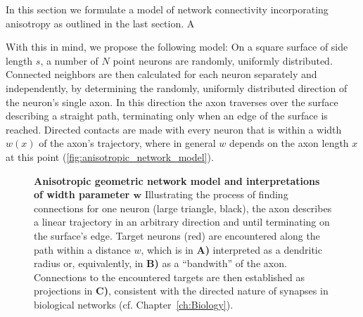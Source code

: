 




In this section we formulate a model of network connectivity
incorporating anisotropy as outlined in the last section. A 

With this in mind, we propose the following model: On a square surface
of side length $s$, a number of $N$ point neurons are randomly,
uniformly distributed.  Connected neighbors are then calculated for
each neuron separately and independently, by determining the randomly,
uniformly distributed direction of the neuron's single axon. In this
direction the axon traverses over the surface describing a straight
path, terminating only when an edge of the surface is
reached. Directed contacts are made with every neuron that is within a
width $w(x)$ of the axon's trajectory, where in general $w$ depends on
the axon length $x$ at this point
(\autoref{fig:anisotropic_network_model}).

\begin{figure}[!htbp]
  \centering 
    \caption{%
      \textbf{Anisotropic geometric network model and interpretations
        of width parameter $\boldsymbol w$} Illustrating the process of
      finding connections for one neuron (large triangle, black), the
      axon describes a linear trajectory in an arbitrary direction and
      until terminating on the surface's edge. Target neurons (red)
      are encountered along the path within a distance $w$, which is in
      \textbf{A)} interpreted as a dendritic radius or, equivalently,
      in \textbf{B)} as a \enquote{bandwith} of the axon. Connections
      to the encountered targets are then established as projections
      in \textbf{C)}, consistent with the directed nature of synapses
      in biological networks (cf. Chapter~\ref{ch:Biology}).}
  \label{fig:anisotropic_network_model}
\end{figure}

